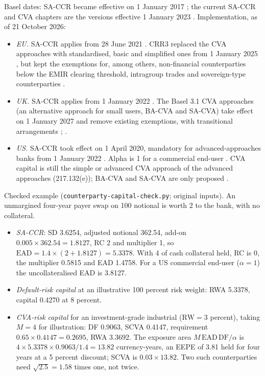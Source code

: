 \begin{qfrule}
 Basel dates: SA-CCR became effective on 1 January 2017 \citep[sec.~D, p.~3]{bcbs-sa-ccr-2014}; the current SA-CCR and CVA chapters are the versions effective 1 January 2023 \citep[CRE52 and MAR50]{basel-framework-ccr-mar-2026}. Implementation, as of 21 October 2026:
\begin{itemize}
\item \emph{EU.} SA-CCR applies from 28 June 2021 \citep[Art.~3(2)]{eu-2019-876-crr2}. CRR3 replaced the CVA approaches with standardised, basic and simplified ones from 1 January 2025 \citep[Art.~1(199) and Art.~2]{eu-2024-1623-crr3}, but kept the exemptions for, among others, non-financial counterparties below the EMIR clearing threshold, intragroup trades and sovereign-type counterparties \citep[Art.~382(4)]{eu-2013-575-crr}.
\item \emph{UK.} SA-CCR applies from 1 January 2022 \citep[p.~8]{pra-ps17-21-basel-2021}. The Basel 3.1 CVA approaches (an alternative approach for small users, BA-CVA and SA-CVA) take effect on 1 January 2027 and remove existing exemptions, with transitional arrangements \citep[paras~1.8 and~1.13]{pra-ps17-23-basel31-2023}; \citep[para.~1.23]{pra-ps1-26-basel31-2026}.
\item \emph{US.} SA-CCR took effect on 1 April 2020, mandatory for advanced-approaches banks from 1 January 2022 \citep[p.~4362]{us-sa-ccr-rule-2020}. Alpha is 1 for a commercial end-user \citep[12 CFR 217.132(c)(5)(iv)]{ecfr-12cfr217-2026}. CVA capital is still the simple or advanced CVA approach of the advanced approaches (217.132(e)); BA-CVA and SA-CVA are only proposed \citep[p.~14955]{us-capital-proposal-2026}.
\end{itemize}

 Checked example (\texttt{counterparty-capital-check.py}; original inputs). An unmargined four-year payer swap on 100 notional is worth 2 to the bank, with no collateral.
\begin{itemize}
\item \emph{SA-CCR}: SD 3.6254, adjusted notional 362.54, add-on $0.005\times362.54=1.8127$, RC 2 and multiplier 1, so $\mathrm{EAD}=1.4\times(2+1.8127)=5.3378$. With 4 of cash collateral held, RC is 0, the multiplier 0.5815 and EAD 1.4758. For a US commercial end-user ($\alpha=1$) the uncollateralised EAD is 3.8127.
\item \emph{Default-risk capital} at an illustrative 100 percent risk weight: RWA 5.3378, capital 0.4270 at 8 percent.
\item \emph{CVA-risk capital} for an investment-grade industrial ($\mathrm{RW}=3$ percent), taking $M=4$ for illustration: DF 0.9063, SCVA 0.4147, requirement $0.65\times0.4147=0.2695$, RWA 3.3692. The exposure area $M\,\mathrm{EAD}\,\mathrm{DF}/\alpha$ is $4\times5.3378\times0.9063/1.4=13.82$ currency-years, an EEPE of 3.81 held for four years at a 5 percent discount; SCVA is $0.03\times13.82$. Two such counterparties need $\sqrt{2.5}=1.58$ times one, not twice.
\end{itemize}


\end{qfrule}
